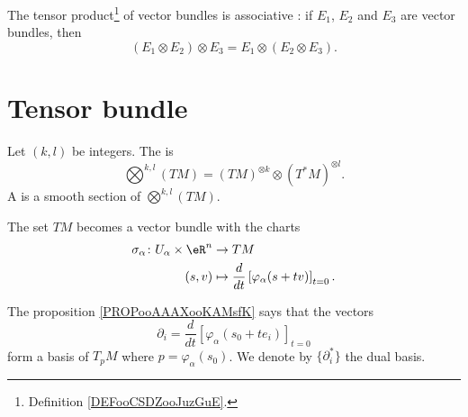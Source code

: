 \begin{proposition}		\label{PROPooEYSWooOeQNyX}
	The tensor product\footnote{Definition \ref{DEFooCSDZooJuzGuE}.} of vector bundles is associative : if \( E_1\), \( E_2\) and \( E_3\) are vector bundles, then
	\begin{equation}
		(E_1\otimes E_2)\otimes E_3=E_1\otimes (E_2\otimes E_3).
	\end{equation}
\end{proposition}


\section{Tensor bundle}

\begin{definition}
	Let \( (k,l)\) be integers. The  is
	\begin{equation}
		\bigotimes^{k,l}(TM)=(TM)^{\otimes k}\otimes (T^*M)^{\otimes l}.
	\end{equation}
	A  is a smooth section of \( \bigotimes^{k,l}(TM)\).
\end{definition}

\begin{proposition}		\label{PROPooIMOJooKzEDXA}
	The set \( TM\) becomes a vector bundle with the charts
	\begin{equation}
		\begin{aligned}
			\sigma_{\alpha}\colon U_{\alpha}\times \eR^n & \to TM                                                              \\
			(s,v)                                        & \mapsto  \frac{d}{dt} \left[ \varphi_{\alpha}(s+tv)  \right]_{t=0}.
		\end{aligned}
	\end{equation}
\end{proposition}

\noproof

The proposition \ref{PROPooAAAXooKAMsfK} says that the vectors
\begin{equation}
	\partial_i=\frac{d}{dt} \left[ \varphi_{\alpha}(s_0+te_i)  \right]_{t=0}
\end{equation}
form a basis of \( T_pM\) where \( p=\varphi_{\alpha}(s_0)\). We denote by \( \{ \partial_{i}^* \}\) the dual basis.

